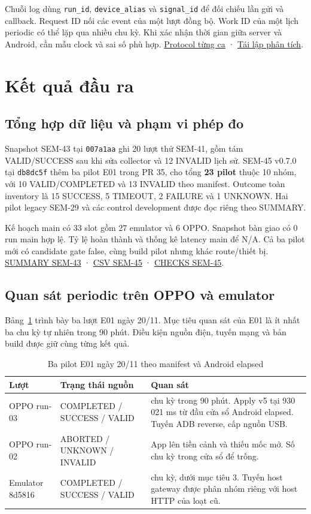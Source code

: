 \documentclass[12pt,a4paper]{report}
\newcommand{\repo}{https://github.com/ThanhTris/Seminar-IE307/blob/db8dc5f}
\newcommand{\source}[2]{\href{\repo/#1}{#2}}
\begin{document}
Chuỗi log dùng \texttt{run\_id}, \texttt{device\_alias} và \texttt{signal\_id} để đối chiếu lần gửi và callback. Request ID nối các event của một lượt đồng bộ. Work ID của một lịch periodic có thể lặp qua nhiều chu kỳ. Khi xác nhận thời gian giữa server và Android, cần mẫu clock và sai số phù hợp. \source{experiments/PROTOCOL.md}{Protocol từng ca} · \source{experiments/ANALYSIS.md}{Tái lập phân tích}.

\section{Kết quả đầu ra}
\label{sec:results}
\subsection{Tổng hợp dữ liệu và phạm vi phép đo}
Snapshot SEM-43 tại \texttt{007a1aa} ghi 20 lượt thử SEM-41, gồm tám VALID/SUCCESS sau khi sửa collector và 12 INVALID lịch sử. SEM-45 v0.7.0 tại \texttt{db8dc5f} thêm ba pilot E01 trong PR 35, cho tổng \textbf{23 pilot} thuộc 10 nhóm, với 10 VALID/COMPLETED và 13 INVALID theo manifest. Outcome toàn inventory là 15 SUCCESS, 5 TIMEOUT, 2 FAILURE và 1 UNKNOWN. Hai pilot legacy SEM-29 và các control development được đọc riêng theo SUMMARY.

Kế hoạch main có 33 slot gồm 27 emulator và 6 OPPO. Snapshot bàn giao có 0 run main hợp lệ. Tỷ lệ hoàn thành và thống kê latency main để N/A. Cả ba pilot mới có candidate gate false, cùng build pilot nhưng khác route/thiết bị. \source{experiments/SUMMARY.md}{SUMMARY SEM-43} · \source{experiments/results.csv}{CSV SEM-45} · \source{docs/evidence/SEM-45/CHECKS.md}{CHECKS SEM-45}.

\subsection{Quan sát periodic trên OPPO và emulator}
Bảng~\ref{tab:e01} trình bày ba lượt E01 ngày 20/11. Mục tiêu quan sát của E01 là ít nhất ba chu kỳ tự nhiên trong 90 phút. Điều kiện nguồn điện, tuyến mạng và bản build được giữ cùng từng kết quả.

\begin{table}[htbp]
\centering
\small
\caption{Ba pilot E01 ngày 20/11 theo manifest và Android elapsed}
\label{tab:e01}
\begin{tabularx}{\textwidth}{@{}p{2.7cm}>{\raggedright\arraybackslash}p{3.9cm}>{\raggedright\arraybackslash}X@{}}
\toprule
Lượt & Trạng thái nguồn & Quan sát \\
\midrule
OPPO run-03 & COMPLETED / SUCCESS / VALID & 5 chu kỳ trong 90 phút. Apply v5 tại 930\,021 ms từ đầu cửa sổ Android elapsed. Tuyến ADB reverse, cấp nguồn USB. \\
OPPO run-02 & ABORTED / UNKNOWN / INVALID & App lên tiền cảnh và thiếu mốc mở. Số chu kỳ trong cửa sổ để trống. \\
Emulator 8d5816 & COMPLETED / SUCCESS / VALID & 2 chu kỳ, dưới mục tiêu 3. Tuyến host gateway được phân nhóm riêng với host HTTP của loạt cũ. \\
\bottomrule
\end{tabularx}
\end{table}
\end{document}
